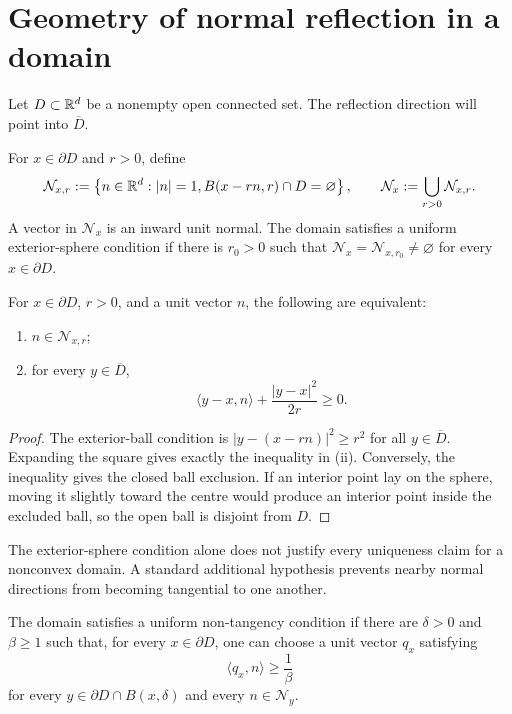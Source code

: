 \section{Geometry of normal reflection in a domain}

Let $D\subset\mathbb R^d$ be a nonempty open connected set. The reflection direction
will point into $\overline D$.

\begin{definition}
For $x\in\partial D$ and $r>0$, define
\[
  \mathcal N_{x,r}
  :=\left\{n\in\mathbb R^d:|n|=1,
       B(x-rn,r)\cap D=\varnothing\right\},
  \qquad
  \mathcal N_x:=\bigcup_{r>0}\mathcal N_{x,r}.
\]
A vector in $\mathcal N_x$ is an inward unit normal. The domain satisfies a
uniform exterior-sphere condition if there is $r_0>0$ such that
$\mathcal N_x=\mathcal N_{x,r_0}\neq\varnothing$ for every
$x\in\partial D$.
\end{definition}

\begin{proposition}
For $x\in\partial D$, $r>0$, and a unit vector $n$, the following are
equivalent:
\begin{enumerate}[label=(\roman*)]
  \item $n\in\mathcal N_{x,r}$;
  \item for every $y\in\overline D$,
  \[
    \langle y-x,n\rangle+\frac{|y-x|^2}{2r}\geq0.
  \]
\end{enumerate}
\end{proposition}

\begin{proof}
The exterior-ball condition is
$|y-(x-rn)|^2\geq r^2$ for all $y\in\overline D$. Expanding the square gives
exactly the inequality in (ii). Conversely, the inequality gives the closed
ball exclusion. If an interior point lay on the sphere, moving it slightly
toward the centre would produce an interior point inside the excluded ball,
so the open ball is disjoint from $D$.
\end{proof}

The exterior-sphere condition alone does not justify every uniqueness claim
for a nonconvex domain. A standard additional hypothesis prevents nearby
normal directions from becoming tangential to one another.

\begin{definition}
The domain satisfies a uniform non-tangency condition if there are
$\delta>0$ and $\beta\geq1$ such that, for every $x\in\partial D$, one can
choose a unit vector $q_x$ satisfying
\[
  \langle q_x,n\rangle\geq\frac1\beta
\]
for every $y\in\partial D\cap B(x,\delta)$ and every
$n\in\mathcal N_y$.
\end{definition}

